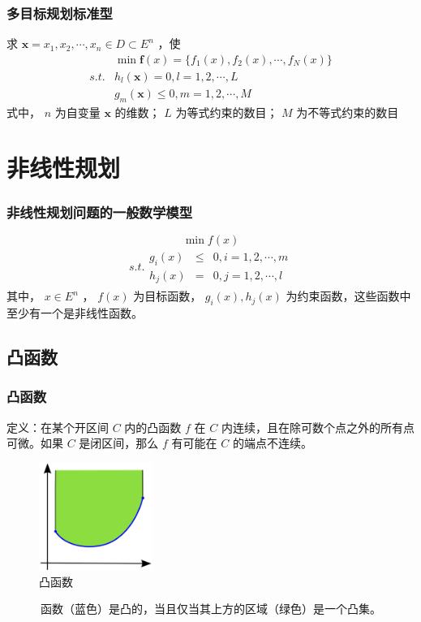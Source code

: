 \documentclass[slidestop,compress,mathserif,c]{beamer}
\begin{document}
\begin{frame}
\frametitle{多目标规划标准型}
求  $ \mathbf{x}={x_1,x_2,\cdots,x_n}\in D\subset E^n $ ，使
      \begin{eqnarray*}
        & \min \mathbf{f}(x)=\{f_1(x),f_2(x),\cdots,f_N(x)\}\\
      s.t. & h_l(\mathbf{x})= 0, l=1,2,\cdots,L\\
           & g_m(\mathbf{x})\leq0, m=1,2,\cdots,M
  \end{eqnarray*}
式中， $ n $  为自变量 $ \mathbf{x} $ 的维数； $ L $ 为等式约束的数目； $ M $ 为不等式约束的数目
\end{frame}


\section{非线性规划}
\begin{frame}
\frametitle{非线性规划问题的一般数学模型}
 $$ \min f(x) $$ 
\begin{eqnarray*}
  s.t.\begin{array}{ccc}
    g_i(x)&\leq&0,i=1,2,\cdots,m\\
    h_j(x)&=&0,j=1,2,\cdots,l
  \end{array}
\end{eqnarray*}
其中， $ x\in E^n $ ， $ f(x) $ 为目标函数， $ g_i(x),h_j(x) $ 为约束函数，这些函数中至少有一个是非线性函数。

\end{frame}


\subsection{\hfill 凸函数}
\begin{frame}
\frametitle{凸函数}
定义：在某个开区间 $ C $ 内的凸函数 $ f $ 在 $ C $ 内连续，且在除可数个点之外的所有点可微。如果 $ C $ 是闭区间，那么 $ f $ 有可能在 $ C $ 的端点不连续。
  \begin{figure}[htbp]
    \centering
    \caption{凸函数}
    \includegraphics[width=3.7cm]{tuhanshu.png}
  \end{figure}
~~~~~~函数（蓝色）是凸的，当且仅当其上方的区域（绿色）是一个凸集。

\end{frame}
\end{document}
